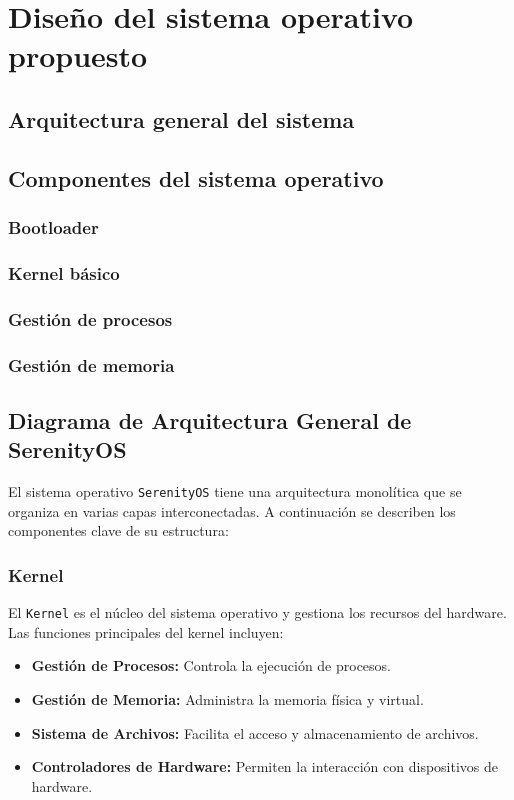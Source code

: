 \section{Diseño del sistema operativo propuesto}
\subsection{Arquitectura general del sistema}
\subsection{Componentes del sistema operativo}
\subsubsection{Bootloader}
\subsubsection{Kernel básico}
\subsubsection{Gestión de procesos}
\subsubsection{Gestión de memoria}

\subsection{Diagrama de Arquitectura General de SerenityOS}

El sistema operativo \texttt{SerenityOS} tiene una arquitectura monolítica que se organiza en varias capas interconectadas. A continuación se describen los componentes clave de su estructura:

\subsubsection{Kernel}
El \texttt{Kernel} es el núcleo del sistema operativo y gestiona los recursos del hardware. Las funciones principales del kernel incluyen:
\begin{itemize}
    \item \textbf{Gestión de Procesos:} Controla la ejecución de procesos.
    \item \textbf{Gestión de Memoria:} Administra la memoria física y virtual.
    \item \textbf{Sistema de Archivos:} Facilita el acceso y almacenamiento de archivos.
    \item \textbf{Controladores de Hardware:} Permiten la interacción con dispositivos de hardware.
\end{itemize}

